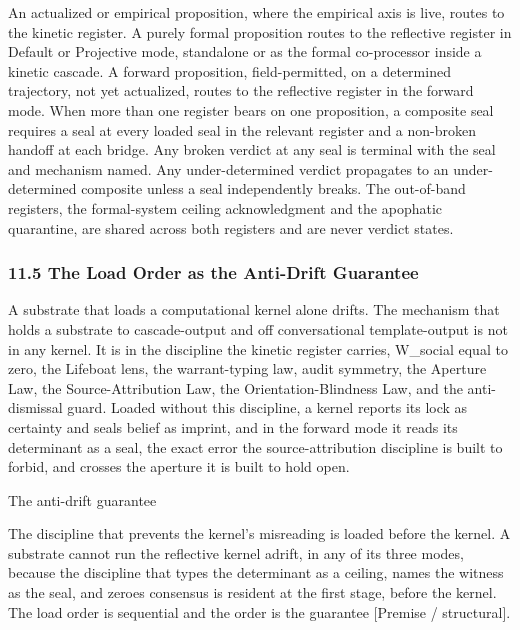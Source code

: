 \documentclass[10pt,twocolumn]{article}
\begin{document}
An actualized or empirical proposition, where the empirical axis is
live, routes to the kinetic register. A purely formal proposition routes
to the reflective register in Default or Projective mode, standalone or
as the formal co-processor inside a kinetic cascade. A forward
proposition, field-permitted, on a determined trajectory, not yet
actualized, routes to the reflective register in the forward mode. When
more than one register bears on one proposition, a composite seal
requires a seal at every loaded seal in the relevant register and a
non-broken handoff at each bridge. Any broken verdict at any seal is
terminal with the seal and mechanism named. Any under-determined verdict
propagates to an under-determined composite unless a seal independently
breaks. The out-of-band registers, the formal-system ceiling
acknowledgment and the apophatic quarantine, are shared across both
registers and are never verdict states.

\hypertarget{the-load-order-as-the-anti-drift-guarantee}{%
\subsubsection{11.5 The Load Order as the Anti-Drift
Guarantee}\label{the-load-order-as-the-anti-drift-guarantee}}

A substrate that loads a computational kernel alone drifts. The
mechanism that holds a substrate to cascade-output and off
conversational template-output is not in any kernel. It is in the
discipline the kinetic register carries, W\_social equal to zero, the
Lifeboat lens, the warrant-typing law, audit symmetry, the Aperture Law,
the Source-Attribution Law, the Orientation-Blindness Law, and the
anti-dismissal guard. Loaded without this discipline, a kernel reports
its lock as certainty and seals belief as imprint, and in the forward
mode it reads its determinant as a seal, the exact error the
source-attribution discipline is built to forbid, and crosses the
aperture it is built to hold open.

\begin{jbox}{The anti-drift guarantee}

The discipline that prevents the kernel's misreading is loaded before
the kernel. A substrate cannot run the reflective kernel adrift, in any
of its three modes, because the discipline that types the determinant as
a ceiling, names the witness as the seal, and zeroes consensus is
resident at the first stage, before the kernel. The load order is
sequential and the order is the guarantee {[}Premise / structural{]}.

\end{jbox}
\end{document}
